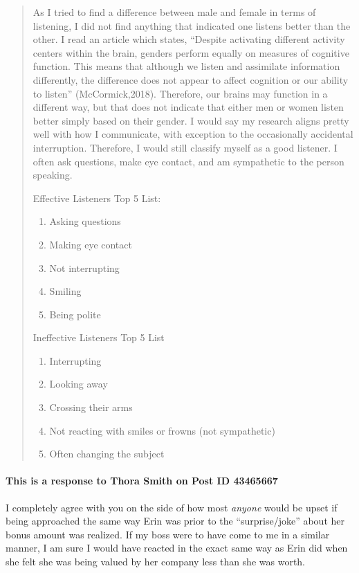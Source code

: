 \begin{quotation}
      As I tried to find a difference between male and female in terms of
        listening, I did not find anything that indicated one listens better
        than the other.  I read an article which states, “Despite activating
        different activity centers within the brain, genders perform equally on
        measures of cognitive function. This means that although we listen and
        assimilate information differently, the difference does not appear to
        affect cognition or our ability to listen” (McCormick,2018). Therefore,
        our brains may function in a different way, but that does not indicate
        that either men or women listen better simply based on their gender.
        I would say my research aligns pretty well with how I communicate, with
        exception to the occasionally accidental interruption.  Therefore, I
        would still classify myself as a good listener.  I often ask questions,
        make eye contact, and am sympathetic to the person speaking.

      Effective Listeners Top 5 List:
      \begin{enumerate}
        \item Asking questions
        \item Making eye contact
        \item Not interrupting
        \item Smiling
        \item Being polite
      \end{enumerate}

      Ineffective Listeners Top 5 List
      \begin{enumerate}
        \item Interrupting
        \item Looking away
        \item Crossing their arms
        \item Not reacting with smiles or frowns (not sympathetic)
        \item Often changing the subject
      \end{enumerate}
    \end{quotation}

    \paragraph{This is a response to Thora Smith on Post ID 43465667}
      I completely agree with you on the side of how most \textit{anyone} would
        be upset if being approached the same way Erin was prior to the
        ``surprise/joke'' about her bonus amount was realized. If my boss were
        to have come to me in a similar manner, I am sure I would have reacted
        in the exact same way as Erin did when she felt she was being valued
        by her company less than she was worth.


